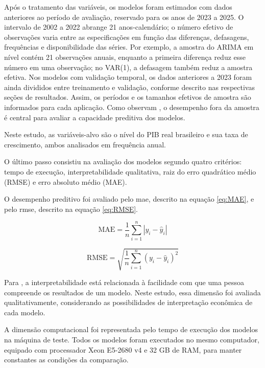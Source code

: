 Após o tratamento das variáveis, os modelos foram estimados com dados anteriores ao período de avaliação, reservado para os anos de 2023 a 2025. O intervalo de 2002 a 2022 abrange 21 anos-calendário; o número efetivo de observações varia entre as especificações em função das diferenças, defasagens, frequências e disponibilidade das séries. Por exemplo, a amostra do ARIMA em nível contém 21 observações anuais, enquanto a primeira diferença reduz esse número em uma observação; no VAR(1), a defasagem também reduz a amostra efetiva. Nos modelos com validação temporal, os dados anteriores a 2023 foram ainda divididos entre treinamento e validação, conforme descrito nas respectivas seções de resultados. Assim, os períodos e os tamanhos efetivos de amostra são informados para cada aplicação. Como observam , o desempenho fora da amostra é central para avaliar a capacidade preditiva dos modelos.

Neste estudo, as variáveis-alvo são o nível do PIB real brasileiro e sua taxa de crescimento, ambos analisados em frequência anual.

O último passo consistiu na avaliação dos modelos segundo quatro critérios: tempo de execução, interpretabilidade qualitativa, raiz do erro quadrático médio (RMSE) e erro absoluto médio (MAE).

O desempenho preditivo foi avaliado pelo \ac{mae}, descrito na equação \ref{eq:MAE}, e pelo \ac{rmse}, descrito na equação \ref{eq:RMSE}.

\begin{equation}
	\label{eq:MAE}
\text{MAE} = \frac{1}{n}\sum_{i=1}^{n}|y_i-\hat{y}_i|
\end{equation}

\begin{equation}
	\label{eq:RMSE}
\text{RMSE} = \sqrt{\frac{1}{n}\sum_{i=1}^{n}(y_i-\hat{y}_i)^2}
\end{equation}


Para , a interpretabilidade está relacionada à facilidade com que uma pessoa compreende os resultados de um modelo. Neste estudo, essa dimensão foi avaliada qualitativamente, considerando as possibilidades de interpretação econômica de cada modelo.


A dimensão computacional foi representada pelo tempo de execução dos modelos na máquina de teste. Todos os modelos foram executados no mesmo computador, equipado com processador Xeon E5-2680 v4 e 32 GB de RAM, para manter constantes as condições da comparação.


